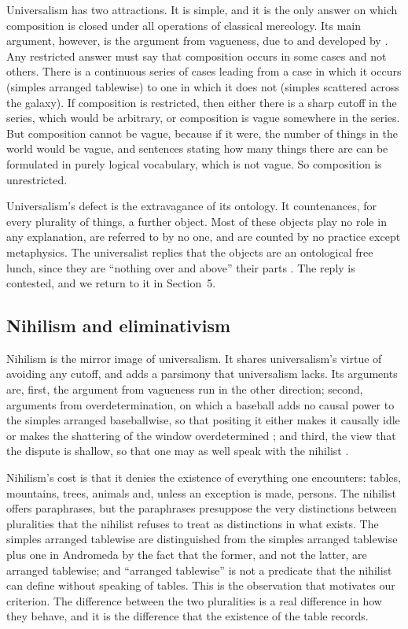 \documentclass{situationist-preprint}
\begin{document}
Universalism has two attractions. It is simple, and it is the only answer on which composition is closed under all operations of classical mereology. Its main argument, however, is the argument from vagueness, due to \citet[pp.~211--213]{Lewis1986} and developed by \citet[§4.9]{Sider2001}. Any restricted answer must say that composition occurs in some cases and not others. There is a continuous series of cases leading from a case in which it occurs (simples arranged tablewise) to one in which it does not (simples scattered across the galaxy). If composition is restricted, then either there is a sharp cutoff in the series, which would be arbitrary, or composition is vague somewhere in the series. But composition cannot be vague, because if it were, the number of things in the world would be vague, and sentences stating how many things there are can be formulated in purely logical vocabulary, which is not vague. So composition is unrestricted.

Universalism's defect is the extravagance of its ontology. It countenances, for every plurality of things, a further object. Most of these objects play no role in any explanation, are referred to by no one, and are counted by no practice except metaphysics. The universalist replies that the objects are an ontological free lunch, since they are \enquote{nothing over and above} their parts \citep[pp.~81--87]{Lewis1991}. The reply is contested, and we return to it in Section~5.

\subsection{Nihilism and eliminativism}

Nihilism is the mirror image of universalism. It shares universalism's virtue of avoiding any cutoff, and adds a parsimony that universalism lacks. Its arguments are, first, the argument from vagueness run in the other direction; second, arguments from overdetermination, on which a baseball adds no causal power to the simples arranged baseballwise, so that positing it either makes it causally idle or makes the shattering of the window overdetermined \citep{Merricks2001}; and third, the view that the dispute is shallow, so that one may as well speak with the nihilist \citep{Sider2013}.

Nihilism's cost is that it denies the existence of everything one encounters: tables, mountains, trees, animals and, unless an exception is made, persons. The nihilist offers paraphrases, but the paraphrases presuppose the very distinctions between pluralities that the nihilist refuses to treat as distinctions in what exists. The simples arranged tablewise are distinguished from the simples arranged tablewise plus one in Andromeda by the fact that the former, and not the latter, are arranged tablewise; and \enquote{arranged tablewise} is not a predicate that the nihilist can define without speaking of tables. This is the observation that motivates our criterion. The difference between the two pluralities is a real difference in how they behave, and it is the difference that the existence of the table records.
\end{document}
